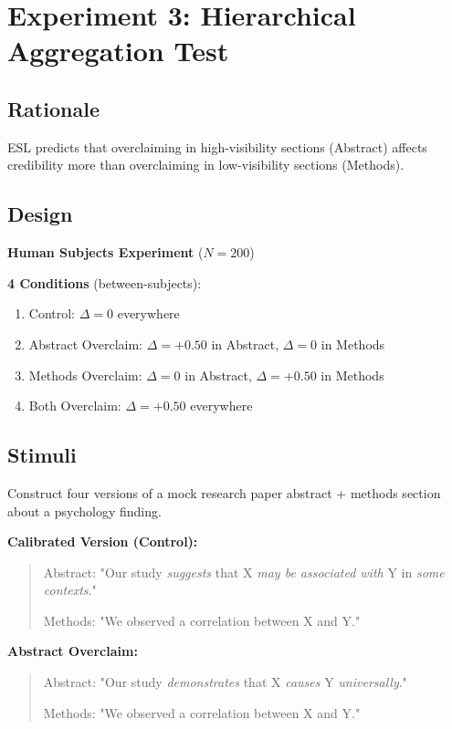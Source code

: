 \documentclass[11pt,a4paper]{article}
\begin{document}
\section{Experiment 3: Hierarchical Aggregation Test}

\subsection{Rationale}

ESL predicts that overclaiming in high-visibility sections (Abstract) affects credibility more than overclaiming in low-visibility sections (Methods).

\subsection{Design}

\textbf{Human Subjects Experiment} ($N = 200$)

\textbf{4 Conditions} (between-subjects):
\begin{enumerate}
    \item Control: $\Delta = 0$ everywhere
    \item Abstract Overclaim: $\Delta = +0.50$ in Abstract, $\Delta = 0$ in Methods
    \item Methods Overclaim: $\Delta = 0$ in Abstract, $\Delta = +0.50$ in Methods
    \item Both Overclaim: $\Delta = +0.50$ everywhere
\end{enumerate}

\subsection{Stimuli}

Construct four versions of a mock research paper abstract + methods section about a psychology finding.

\textbf{Calibrated Version (Control):}
\begin{quote}
Abstract: "Our study \emph{suggests} that X \emph{may be associated with} Y in \emph{some contexts}."

Methods: "We observed a correlation between X and Y."
\end{quote}

\textbf{Abstract Overclaim:}
\begin{quote}
Abstract: "Our study \emph{demonstrates} that X \emph{causes} Y \emph{universally}."

Methods: "We observed a correlation between X and Y."
\end{quote}
\end{document}

